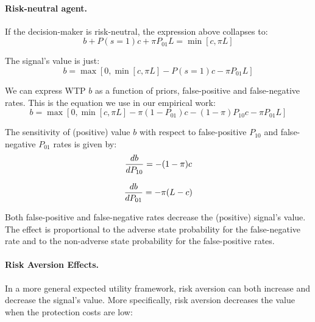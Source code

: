 \documentclass[12pt,a4paper]{article}
\begin{document}
\paragraph{Risk-neutral agent.} If the decision-maker is risk-neutral, the expression above collapses to:
$$b+P(s=1)c+\pi P_{01}L=\min[c,\pi L]$$

The signal's value is just:
\begin{equation}
b=\max[0,\min[c,\pi L]-P(s=1)c-\pi P_{01}L]
\end{equation}

We can express WTP $b$ as a function of priors, false-positive and false-negative rates. This is the equation we use in our empirical work:
\begin{equation}
b=\max[0,\min[c,\pi L]-\pi (1-P_{01})c-(1-\pi)P_{10}c-\pi P_{01}L]
\end{equation}\label{eq:rnWTP}

The sensitivity of (positive) value $b$ with respect to false-positive $P_{10}$ and false-negative $P_{01}$ rates is given by:
\begin{equation}
{db\over dP_{10}}=-(1-\pi)c
\end{equation}

\begin{equation}
{db\over dP_{01}}=-\pi(L-c)
\end{equation}
\vspace{10pt}

Both false-positive and false-negative rates decrease the (positive) signal's value. The effect is proportional to the adverse state probability for the false-negative rate and to the non-adverse state probability for the false-positive rates.

\paragraph{Risk Aversion Effects.} In a more general expected utility framework, risk aversion can both increase and decrease the signal's value. More specifically, risk aversion decreases the value when the protection costs are low: 
\end{document}
